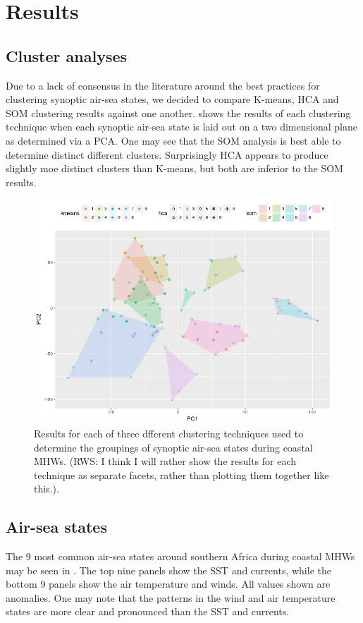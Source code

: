 \documentclass[a4paper,10pt,review]{elsarticle}
\begin{document}
\section{Results}
\subsection{Cluster analyses}
Due to a lack of consensus in the literature around the best practices for clustering synoptic air-sea states, we decided to compare K-means, HCA and SOM clustering results against one another.  shows the results of each clustering technique when each synoptic air-sea state is laid out on a two dimensional plane as determined via a PCA. One may see that the SOM analysis is best able to determine distinct different clusters. Surprisingly HCA appears to produce slightly moe distinct clusters than K-means, but both are inferior to the SOM results.

\begin{figure}
\includegraphics[width=1.0\textwidth]{figure_3.png}
\caption{Results for each of three dfferent clustering techniques used to determine the groupings of synoptic air-sea states during coastal MHWs. (RWS: I think I will rather show the results for each technique as separate facets, rather than plotting them together like this.).}
\label{figure3}
\end{figure}

\subsection{Air-sea states}
The 9 most common air-sea states around southern Africa during coastal MHWs may be seen in . The top nine panels show the SST and currents, while the bottom 9 panels show the air temperature and winds. All values shown are anomalies. One may note that the patterns in the wind and air temperature states are more clear and pronounced than the SST and currents.
\end{document}
